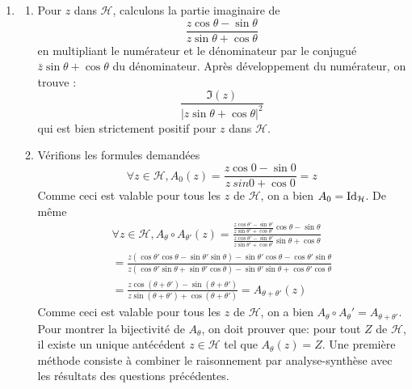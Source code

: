 \begin{enumerate}
\item
 \begin{enumerate}
 \item Pour $z$ dans $\mathcal{H}$, calculons la partie imaginaire de
\begin{displaymath}
 \frac{z\cos\theta-\sin\theta}{z\sin\theta+\cos\theta}
\end{displaymath}
en multipliant le numérateur et le dénominateur par le conjugué $\bar{z}\sin \theta + \cos \theta$ du dénominateur. Après développement du numérateur, on trouve :
\begin{displaymath}
 \frac{\Im (z)}{|z\sin\theta+\cos\theta|^2}
\end{displaymath}
qui est bien strictement positif pour $z$ dans $\mathcal{H}$.
\item Vérifions les formules demandées
\begin{displaymath}
 \forall z\in \mathcal{H},
A_0(z) = \frac{z\cos 0 - \sin 0}{z\ sin 0 + \cos 0}=z
\end{displaymath}
Comme ceci est valable pour tous les $z$ de $\mathcal{H}$, on a bien $A_0= \operatorname{Id}_\mathcal{H}$.\newline
De même
\begin{multline*}
\forall z\in \mathcal{H}, A_\theta \circ A_{\theta'}(z)
=\frac
{\frac{z\cos \theta' - \sin \theta'}{z\sin\theta' + \cos \theta'}\cos \theta - \sin \theta}
{\frac{z\cos \theta' - \sin \theta'}{z\sin\theta' + \cos \theta'}\sin\theta + \cos \theta} \\
=\frac
  {z(\cos\theta' \cos\theta - \sin\theta' \sin \theta) -\sin\theta' \cos \theta - \cos \theta'\sin\theta }
  {z(\cos \theta' \sin \theta + \sin \theta' \cos \theta) -\sin\theta'\sin\theta + \cos\theta'\cos \theta}\\
= \frac{z \cos(\theta + \theta')-\sin(\theta + \theta')}{z\sin(\theta + \theta')+\cos(\theta + \theta')}
= A_{\theta + \theta'}(z)
\end{multline*}
Comme ceci est valable pour tous les $z$ de $\mathcal{H}$, on a bien $A_\theta \circ A_\theta' = A_{\theta + \theta'}$.\newline
Pour montrer la bijectivit{\'e} de $A_\theta$, on doit prouver que: pour tout $Z$ de $\mathcal{H}$, il existe un unique ant{\'e}c{\'e}dent $z\in \mathcal{H}$ tel que $A_\theta(z) = Z$.\newline
Une première méthode consiste à combiner le raisonnement par analyse-synthèse avec les résultats des questions précédentes.\newline

\end{enumerate}
\end{enumerate}
